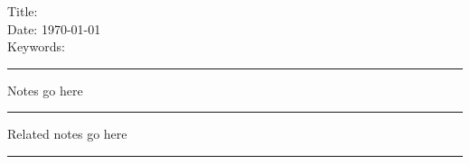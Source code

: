 \documentclass[11pt,a4paper,twoside]{article}
\newcommand{\noteTitle}{}
\begin{document}
Title: \noteTitle{}\\
Date: \today\\
Keywords:\\
\noindent\rule{\textwidth}{1pt}
Notes go here


\noindent\rule{\textwidth}{1pt}
Related notes go here

\noindent\rule{\textwidth}{1pt}
\printbibliography{}
\end{document}
